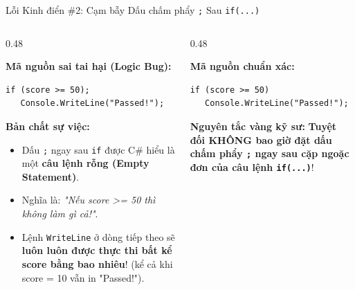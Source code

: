 \documentclass[aspectratio=169, 10pt]{beamer}
\begin{document}
\begin{frame}[fragile]{Lỗi Kinh điển \#2: Cạm bẫy Dấu chấm phẩy \texttt{;} Sau \texttt{if(...)}}
  \begin{columns}[T]
    \begin{column}{0.48\textwidth}
      \begin{alertblock}{\textbf{Mã nguồn sai tai hại (Logic Bug):}}
\begin{lstlisting}
if (score >= 50);
   Console.WriteLine("Passed!");
\end{lstlisting}
      \end{alertblock}
      \begin{block}{\textbf{Bản chất sự việc:}}
        \begin{itemize}\small
          \item Dấu \texttt{;} ngay sau \texttt{if} được C\# hiểu là một \textbf{câu lệnh rỗng (Empty Statement)}.
          \item Nghĩa là: \textit{"Nếu score >= 50 thì không làm gì cả!"}.
          \item Lệnh \texttt{WriteLine} ở dòng tiếp theo sẽ \textbf{luôn luôn được thực thi bất kể score bằng bao nhiêu}! (kể cả khi score = 10 vẫn in "Passed!").
        \end{itemize}
      \end{block}
    \end{column}

    \begin{column}{0.48\textwidth}
      \begin{exampleblock}{\textbf{Mã nguồn chuẩn xác:}}
\begin{lstlisting}
if (score >= 50)
   Console.WriteLine("Passed!");
\end{lstlisting}
      \end{exampleblock}
      \begin{alertblock}{\textbf{Nguyên tắc vàng kỹ sư:}}
        \textbf{Tuyệt đối KHÔNG bao giờ đặt dấu chấm phẩy \texttt{;} ngay sau cặp ngoặc đơn của câu lệnh \texttt{if(...)}}!
      \end{alertblock}
    \end{column}
  \end{columns}
\end{frame}
\end{document}
